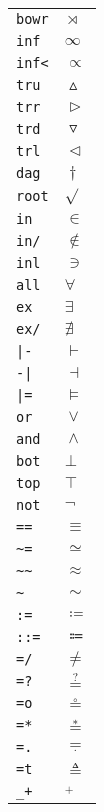 \begin{longtable}{ll}
\texttt{bowr}&${}\rtimes {}$\\
\texttt{inf}&${}\infty {}$\\
\texttt{inf<}&${}\propto {}$\\
\texttt{tru}&${}\vartriangle {}$\\
\texttt{trr}&${}\vartriangleright {}$\\
\texttt{trd}&${}\triangledown {}$\\
\texttt{trl}&${}\vartriangleleft {}$\\
\texttt{dag}&${}\dagger {}$\\
\texttt{root}&${}\sqrt {}$\\
\texttt{in}&${}\in {}$\\
\texttt{in/}&${}\notin {}$\\
\texttt{inl}&${}\ni {}$\\
\texttt{all}&${}\forall {}$\\
\texttt{ex}&${}\exists {}$\\
\texttt{ex/}&${}\nexists {}$\\
\texttt{|{-}}&${}\vdash {}$\\
\texttt{{-}|}&${}\dashv {}$\\
\texttt{|=}&${}\models {}$\\
\texttt{or}&${}\vee {}$\\
\texttt{and}&${}\wedge {}$\\
\texttt{bot}&${}\bot {}$\\
\texttt{top}&${}\top {}$\\
\texttt{not}&${}\neg {}$\\
\texttt{==}&${}\equiv {}$\\
\texttt{\textasciitilde =}&${}\simeq {}$\\
\texttt{\textasciitilde \textasciitilde }&${}\approx {}$\\
\texttt{\textasciitilde }&${}\sim {}$\\
\texttt{:=}&${}\coloneqq {}$\\
\texttt{::=}&${}\Coloneqq {}$\\
\texttt{=/}&${}\neq {}$\\
\texttt{=?}&${}\mathrel{\overset{?}{=}} {}$\\
\texttt{=o}&${}\mathrel{\overset{\circ}{=}} {}$\\
\texttt{=*}&${}\mathrel{\overset{*}{=}} {}$\\
\texttt{=.}&${}\mathrel{\underset{\cdotp}{=}} {}$\\
\texttt{=t}&${}\triangleq {}$\\
\texttt{\_+}&${}_+ {}$\\

\end{longtable}
